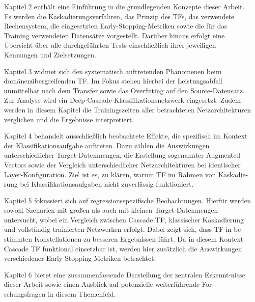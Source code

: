 Kapitel 2 enthält eine Einführung in die grundlegenden Konzepte dieser Arbeit. Es werden die Kaskadierungsverfahren, das Prinzip des 
TFs, das verwendete Rechensystem, die eingesetzten Early-Stopping-Metriken sowie die für das Training verwendeten Datensätze 
vorgestellt. Darüber hinaus erfolgt eine Übersicht über alle durchgeführten Tests einschließlich ihrer jeweiligen Kennungen und Zielsetzungen.

Kapitel 3 widmet sich den systematisch auftretenden Phänomenen beim domänenübergreifenden TF. Im Fokus stehen hierbei der 
Leistungsabfall unmittelbar nach dem Transfer sowie das Overfitting auf den Source-Datensatz. Zur Analyse wird ein 
Deep-Cascade-Klassifikationsnetzwerk eingesetzt. Zudem werden in diesem Kapitel die Trainingszeiten aller betrachteten Netzarchitekturen 
verglichen und die Ergebnisse interpretiert.

Kapitel 4 behandelt ausschließlich beobachtete Effekte, die spezifisch im Kontext der Klassifikationsaufgabe auftreten. Dazu zählen die 
Auswirkungen unterschiedlicher Target-Datenmengen, die Erstellung sogenannter Augmented Vectors sowie der Vergleich 
unterschiedlicher Netzarchitekturen bei identischer Layer-Konfiguration. Ziel ist es, zu klären, warum TF im Rahmen von 
Kaskadie-rung bei Klassifikationsaufgaben nicht zuverlässig funktioniert.

Kapitel 5 fokussiert sich auf regressionsspezifische Beobachtungen. Hierfür werden sowohl Szenarien mit großen als auch mit kleinen Target-Datenmengen 
untersucht, wobei ein Vergleich zwischen Cascade TF, klassischer Kaskadierung und vollständig trainierten Netzwerken erfolgt. 
Dabei zeigt sich, dass TF in be-stimmten Konstellationen zu besseren Ergebnissen führt. Da in diesem Kontext Cascade TF 
funktional einsetzbar ist, werden hier zusätzlich die Auswirkungen verschiedener Early-Stopping-Metriken betrachtet.

Kapitel 6 bietet eine zusammenfassende Darstellung der zentralen Erkennt-nisse dieser Arbeit sowie einen Ausblick auf potenzielle weiterführende 
For-schungsfragen in diesem Themenfeld.
